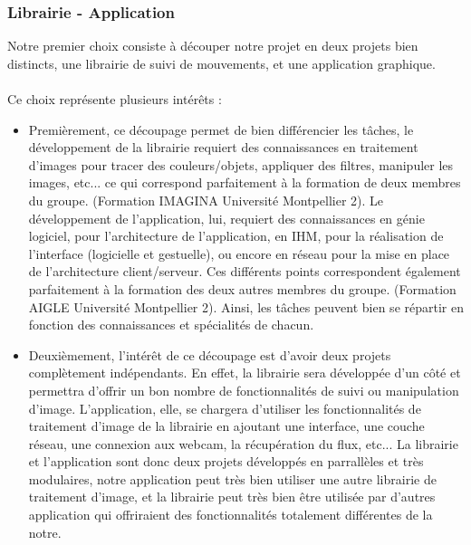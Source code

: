 \documentclass{article}
\begin{document}
			\subsubsection{Librairie - Application}
			Notre premier choix consiste à découper notre projet en deux projets bien distincts, une librairie de suivi de mouvements, et une application graphique. \\ \\
			Ce choix représente plusieurs intérêts : \\
			\begin{itemize}
				\item{Premièrement, ce découpage permet de bien différencier les tâches, le développement de la librairie requiert des connaissances en traitement d'images pour tracer des couleurs/objets, appliquer des filtres, manipuler les images, etc... ce qui correspond parfaitement à la formation de deux membres du groupe. (Formation IMAGINA Université Montpellier 2). Le développement de l'application, lui, requiert des connaissances en génie logiciel, pour l'architecture de l'application, en IHM, pour la réalisation de l'interface (logicielle et gestuelle), ou encore en réseau pour la mise en place de l'architecture client/serveur. Ces différents points correspondent également parfaitement à la formation des deux autres membres du groupe. (Formation AIGLE Université Montpellier 2). Ainsi, les tâches peuvent bien se répartir en fonction des connaissances et spécialités de chacun.} \\
				\item{Deuxièmement, l'intérêt de ce découpage est d'avoir deux projets complètement indépendants. En effet, la librairie sera développée d'un côté et permettra d'offrir un bon nombre de fonctionnalités de suivi ou manipulation d'image. L'application, elle, se chargera d'utiliser les fonctionnalités de traitement d'image de la librairie en ajoutant une interface, une couche réseau, une connexion aux webcam, la récupération du flux, etc...
				La librairie et l'application sont donc deux projets développés en parrallèles et très modulaires, notre application peut très bien utiliser une autre librairie de traitement d'image, et la librairie peut très bien être utilisée par d'autres application qui offriraient des fonctionnalités totalement différentes de la notre.}
			\end{itemize}
\end{document}
